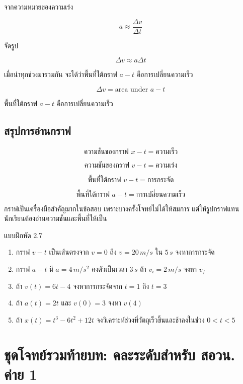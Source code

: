 จากความหมายของความเร่ง

\[
a\approx \frac{\Delta v}{\Delta t}
\]

จัดรูป

\[
\Delta v\approx a\Delta t
\]

เมื่อนำทุกช่วงมารวมกัน จะได้ว่าพื้นที่ใต้กราฟ $a-t$ คือการเปลี่ยนความเร็ว

\[
\Delta v=\text{area under }a-t
\]

\begin{tcolorbox}[title=สรุปกราฟ $a-t$]
พื้นที่ใต้กราฟ $a-t$ คือการเปลี่ยนความเร็ว
\end{tcolorbox}

\subsection{สรุปการอ่านกราฟ}

\[
\text{ความชันของกราฟ }x-t=\text{ความเร็ว}
\]

\[
\text{ความชันของกราฟ }v-t=\text{ความเร่ง}
\]

\[
\text{พื้นที่ใต้กราฟ }v-t=\text{การกระจัด}
\]

\[
\text{พื้นที่ใต้กราฟ }a-t=\text{การเปลี่ยนความเร็ว}
\]

\begin{tcolorbox}[title=ข้อควรจำ]
กราฟเป็นเครื่องมือสำคัญมากในข้อสอบ เพราะบางครั้งโจทย์ไม่ได้ให้สมการ แต่ให้รูปกราฟแทน นักเรียนต้องอ่านความชันและพื้นที่ให้เป็น
\end{tcolorbox}

\begin{exercisebox}{แบบฝึกหัด 2.7}
\begin{enumerate}
    \item กราฟ $v-t$ เป็นเส้นตรงจาก $v=0$ ถึง $v=20\,\si{m/s}$ ใน $5\,\si{s}$ จงหาการกระจัด
    \item กราฟ $a-t$ มี $a=4\,\si{m/s^2}$ คงตัวเป็นเวลา $3\,\si{s}$ ถ้า $v_i=2\,\si{m/s}$ จงหา $v_f$
    \item ถ้า $v(t)=6t-4$ จงหาการกระจัดจาก $t=1$ ถึง $t=3$
    \item ถ้า $a(t)=2t$ และ $v(0)=3$ จงหา $v(4)$
    \item ถ้า $x(t)=t^3-6t^2+12t$ จงวิเคราะห์ช่วงที่วัตถุเร็วขึ้นและช้าลงในช่วง $0<t<5$
\end{enumerate}
\end{exercisebox}

\section{ชุดโจทย์รวมท้ายบท: คละระดับสำหรับ สอวน. ค่าย 1}

